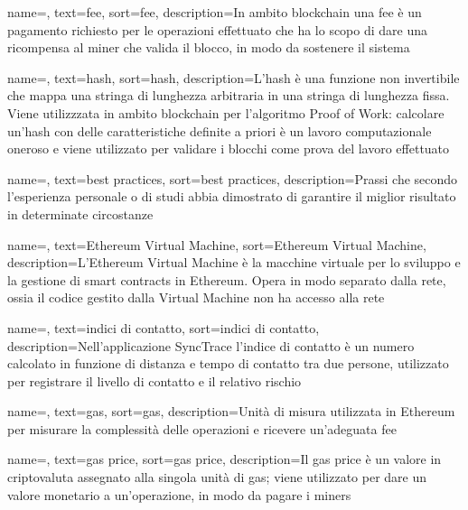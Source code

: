 {
    name=,
    text=fee,
    sort=fee,
    description={In ambito blockchain una fee è un pagamento richiesto per le operazioni effettuato che ha lo scopo di dare una ricompensa al miner che valida il blocco, in modo da sostenere il sistema}
}

{
    name=,
    text=hash,
    sort=hash,
    description={L'hash è una funzione non invertibile che mappa una stringa di lunghezza arbitraria in una stringa di lunghezza fissa. Viene utilizzzata in ambito blockchain per l'algoritmo Proof of Work: calcolare un'hash con delle caratteristiche definite a priori è un lavoro computazionale oneroso e viene utilizzato per validare i blocchi come prova del lavoro effettuato}
}


{
    name=,
    text=best practices,
    sort=best practices,
    description={Prassi che secondo l'esperienza personale o di studi abbia dimostrato di garantire il miglior risultato in determinate circostanze}
}

{
    name=,
    text=Ethereum Virtual Machine,
    sort=Ethereum Virtual Machine,
    description={L'Ethereum Virtual Machine è la macchine virtuale per lo sviluppo e la gestione di smart contracts in Ethereum. Opera in modo separato dalla rete, ossia il codice gestito dalla Virtual Machine non ha accesso alla rete}
}

{
    name=,
    text=indici di contatto,
    sort=indici di contatto,
    description={Nell'applicazione SyncTrace l'indice di contatto è un numero calcolato in funzione di distanza e tempo di contatto tra due persone, utilizzato per registrare il livello di contatto e il relativo rischio}
}

{
    name=,
    text=gas,
    sort=gas,
    description={Unità di misura utilizzata in Ethereum per misurare la complessità delle operazioni e ricevere un'adeguata fee}
}

{
    name=,
    text=gas price,
    sort=gas price,
    description={Il gas price è un valore in criptovaluta assegnato alla singola unità di gas; viene utilizzato per dare un valore monetario a un'operazione, in modo da pagare i miners}
}

